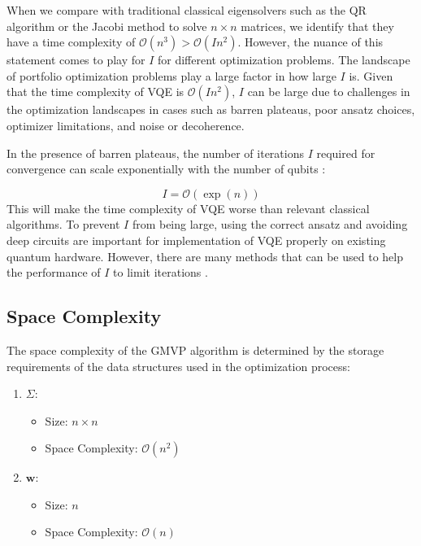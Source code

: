 \documentclass[%
 reprint,
 amsmath,amssymb,
 aps,
]{revtex4-2}
\begin{document}
When we compare with traditional classical eigensolvers such as the QR algorithm or the Jacobi method to solve $n \times n$ matrices, we identify that they have a time complexity of $\mathcal{O}(n^3) > \mathcal{O}(I n^2)$. However, the nuance of this statement comes to play for $I$ for different optimization problems. The landscape of portfolio optimization problems play a large factor in how large $I$ is. Given that the time complexity of VQE is $\mathcal{O}(In^2)$, $I$ can be large due to challenges in the optimization landscapes in cases such as barren plateaus, poor ansatz choices, optimizer limitations, and noise or decoherence.

In the presence of barren plateaus, the number of iterations $I$ required for convergence can scale exponentially with the number  of qubits \cite{McClean2018}:

\begin{equation}
    I = \mathcal{O}(\exp(n))
\end{equation}
This will make the time complexity of VQE worse than relevant classical algorithms. To prevent $I$ from being large, using the correct ansatz and avoiding deep circuits are important for implementation of VQE properly on existing quantum hardware. However, there are many methods that can be used to help the performance of $I$ to limit iterations \cite{Grant2019}.

\subsection{Space Complexity}
The space complexity of the GMVP algorithm is determined by the storage requirements of the data structures used in the optimization process:

\begin{enumerate}
    \item {} $\Sigma$:
    \begin{itemize}
        \item Size: $n \times n$
        \item Space Complexity: $\mathcal{O}(n^2)$
    \end{itemize}
    
    \item {} $\mathbf{w}$:
    \begin{itemize}
        \item Size: $n$
        \item Space Complexity: $\mathcal{O}(n)$
    \end{itemize}
    
\end{enumerate}
\end{document}
